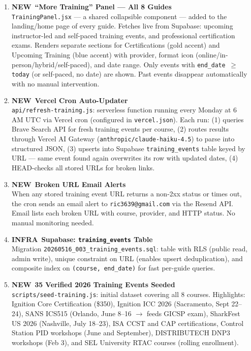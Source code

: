\documentclass[10pt]{article}
\newcommand{\feat}{\textcolor{sgreen}{\small\bfseries NEW}}
\newcommand{\infra}{\textcolor{samber}{\small\bfseries INFRA}}
\begin{document}
\begin{enumerate}[resume]\small
  \item \feat\ \textbf{``More Training'' Panel — All 8 Guides} \\
    \texttt{TrainingPanel.jsx} — a shared collapsible component — added to the landing/home page of every guide. Fetches live from Supabase: upcoming instructor-led and self-paced training events, and professional certification exams. Renders separate sections for Certifications (gold accent) and Upcoming Training (blue accent) with provider, format icon (online/in-person/hybrid/self-paced), and date range. Only events with \texttt{end\_date $\geq$ today} (or self-paced, no date) are shown. Past events disappear automatically with no manual intervention.

  \item \feat\ \textbf{Vercel Cron Auto-Updater} \\
    \texttt{api/refresh-training.js}: serverless function running every Monday at 6 AM UTC via Vercel cron (configured in \texttt{vercel.json}). Each run: (1) queries Brave Search API for fresh training events per course, (2) routes results through Vercel AI Gateway (\texttt{anthropic/claude-haiku-4.5}) to parse into structured JSON, (3) upserts into Supabase \texttt{training\_events} table keyed by URL — same event found again overwrites its row with updated dates, (4) HEAD-checks all stored URLs for broken links.

  \item \feat\ \textbf{Broken URL Email Alerts} \\
    When any stored training event URL returns a non-2xx status or times out, the cron sends an email alert to \texttt{ric3639@gmail.com} via the Resend API. Email lists each broken URL with course, provider, and HTTP status. No manual monitoring needed.

  \item \infra\ \textbf{Supabase: \texttt{training\_events} Table} \\
    Migration \texttt{20260516\_003\_training\_events.sql}: table with RLS (public read, admin write), unique constraint on URL (enables upsert deduplication), and composite index on \texttt{(course, end\_date)} for fast per-guide queries.

  \item \feat\ \textbf{35 Verified 2026 Training Events Seeded} \\
    \texttt{scripts/seed-training.js}: initial dataset covering all 8 courses. Highlights: Ignition Core Certification (\$350), Ignition ICC 2026 (Sacramento, Sept 22--24), SANS ICS515 (Orlando, June 8--16 $\to$ feeds GICSP exam), SharkFest US 2026 (Nashville, July 18--23), ISA CCST and CAP certifications, Control Station PID workshops (June and September), DISTRIBUTECH DNP3 workshops (Feb 3), and SEL University RTAC courses (rolling enrollment).
\end{enumerate}
\end{document}
